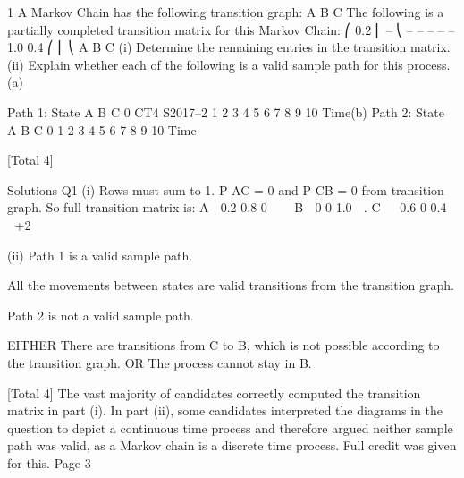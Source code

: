\documentclass[a4paper,12pt]{article}
\begin{document}
1
A Markov Chain has the following transition graph:
A
B
C
The following is a partially completed transition matrix for this Markov Chain:
⎛ 0.2
⎜ –
⎝ –
–
–
–
–
1.0
0.4
⎛
⎜
⎝
A
B
C
(i) Determine the remaining entries in the transition matrix.
(ii) Explain whether each of the following is a valid sample path for this process.
(a)

Path 1:
State
A
B
C
0
CT4 S2017–2
1
2
3
4
5
6
7
8
9
10
Time(b)
Path 2:
State
A
B
C
0
1
2
3
4
5
6
7
8
9 10 Time


[Total 4]



Solutions
Q1
(i)
Rows must sum to 1.
P AC = 0 and P CB = 0 from transition graph.
So full transition matrix is:
A  0.2 0.8 0 


B  0
0 1.0  .
C   0.6 0 0.4  
+2

(ii)
Path 1 is a valid sample path.

All the movements between states are valid transitions from the transition
graph.

Path 2 is not a valid sample path.

EITHER
There are transitions from C to B, which is not possible according to the
transition graph.
OR
The process cannot stay in B.


[Total 4]
The vast majority of candidates correctly computed the transition
matrix in part (i). In part (ii), some candidates interpreted the
diagrams in the question to depict a continuous time process and
therefore argued neither sample path was valid, as a Markov chain is a
discrete time process. Full credit was given for this.
Page 3%
\end{document}
